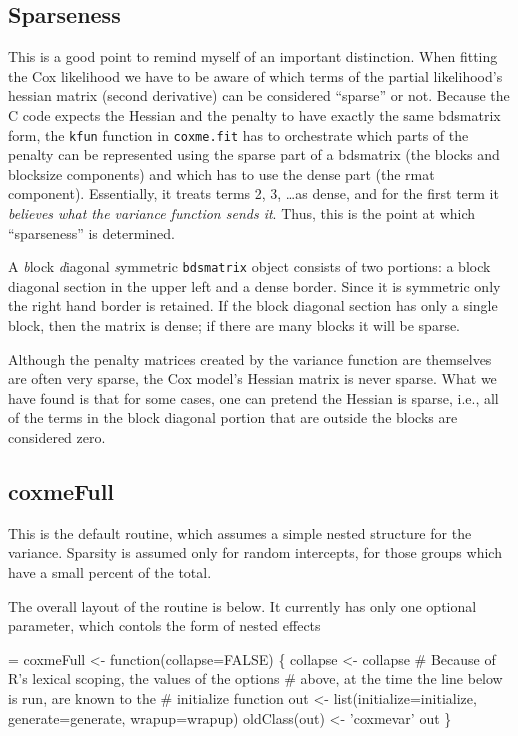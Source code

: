 \documentclass{article}
\begin{document}
\subsection{Sparseness}
This is a good point to remind myself of an important distinction.
When fitting the Cox likelihood we have to be aware of which terms of the
partial likelihood's hessian matrix (second derivative) can be      %
considered ``sparse'' or not.  Because the C code expects the Hessian and the
penalty to have exactly the same bdsmatrix form, the \Verb!kfun! function
in \Verb!coxme.fit! has to orchestrate which parts of the penalty 
can be represented using
the sparse part of a bdsmatrix (the blocks and blocksize components) and
which has to use the dense part (the rmat component).  
Essentially, it treats terms 2, 3, \ldots as dense, and for the first
term it \emph{believes what the variance function sends it}.
Thus, this is the point at which ``sparseness'' is determined.

A \emph{b}lock \emph{d}iagonal \emph{s}ymmetric \Verb!bdsmatrix! object 
consists of two portions: a block diagonal section in the upper left and
a dense border.  Since it is symmetric only the right hand border is
retained.
If the block diagonal section has only a single block, then the matrix
is dense; if there are many blocks it will be sparse.

Although the penalty matrices created by the variance function are
themselves are often very sparse, the Cox model's    %
Hessian matrix is never sparse.  What we have found is that for some
cases, one can pretend the Hessian is sparse, i.e.,
all of the terms in the block diagonal portion that are outside the
blocks are considered zero.  

\subsection{coxmeFull}
This is the default routine, which assumes a simple nested structure
for the variance.
Sparsity is assumed only for random intercepts, for those groups which
have a small percent of the total.

The overall layout of the routine is below.  It currently has only one
optional parameter, which contols the form of nested effects
\begin{nwchunk}
=
 coxmeFull <- function(collapse=FALSE) \{
     collapse <- collapse
     # Because of R's lexical scoping, the values of the options
     #  above, at the time the line below is run, are known to the
     #  initialize function
     out <- list(initialize=initialize, generate=generate, wrapup=wrapup)
     oldClass(out) <- 'coxmevar'
     out
     \}
\end{nwchunk}
\end{document}
